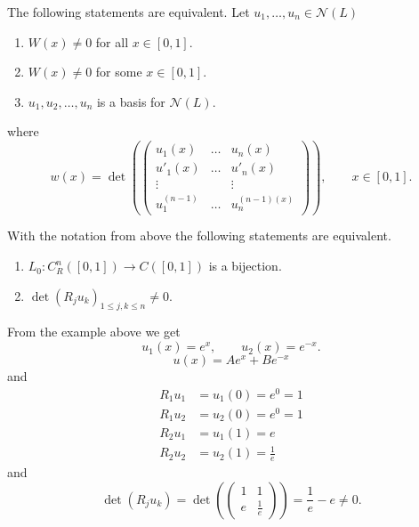 \begin{theorem}
	The following statements are equivalent. Let $u_1,\dots,u_n \in \mathcal{N}(L)$
	\begin{enumerate}
		\item $W(x) \neq 0$ for all $x \in [0,1]$. 
		\item $W(x)\neq  0$ for some $x \in [0,1]$.
		\item $u_1,u_2, \dots,u_n$ is a basis for $\mathcal{N}(L)$.
	\end{enumerate}
	where 
	\[
		w(x) = \det \left( \begin{pmatrix}
			u_1(x) & \dots & u_n(x) \\
			u'_1(x) & \dots & u'_n(x) \\
			\vdots & & \vdots \\
			u_1^{(n-1)} & \dots & u_n^{(n-1)(x)}
		\end{pmatrix} \right), \qquad x \in [0,1].
	\]
\end{theorem}
\begin{theorem}
	With the notation from above the following statements are equivalent.
	\begin{enumerate}
		\item $L_0 : C^n_R( [0,1]) \to C([0,1])$ is a bijection.
		\item $\det(R_ju_k)_{1 \leq j,k \leq n} \neq 0$.
	\end{enumerate}
\end{theorem}

\begin{beispiel}[continue]
	From the example above we get
	\[
		u_1(x) = e^x, \qquad u_2(x) = e^{-x}.
	\]
	\[
		u(x) = A e^x + B e^{-x}
	\]
	and
	\begin{align*}
		R_1u_1 &= u_1(0)=e^0 =1 \\
		R_1u_2 &= u_2(0)=e^0 =1 \\
		R_2u_1 &= u_1(1)=e \\
		R_2u_2 &= u_2(1)=\frac{1}{e}
	\end{align*}
	and 
	\[
		\det(R_ju_k) = \det( \begin{pmatrix}
			1 & 1 \\ e & \frac{1}{e} 
		\end{pmatrix}) = \frac{1}{e} - e \neq 0.
	\]
\end{beispiel}

